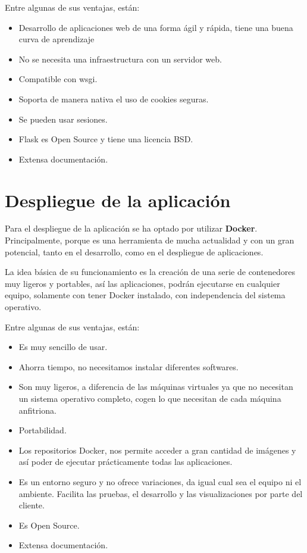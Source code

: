 Entre algunas de sus ventajas, están:
\begin{itemize}
\item Desarrollo de aplicaciones web de una forma ágil y rápida, tiene una buena curva de aprendizaje
\item No se necesita una infraestructura con un servidor web.
\item Compatible con wsgi.
\item Soporta de manera nativa el uso de cookies seguras.
\item Se pueden usar sesiones.
\item Flask es Open Source y tiene una licencia BSD.
\item Extensa documentación.
\end{itemize}

\section{Despliegue de la aplicación}

Para el despliegue de la aplicación se ha optado por utilizar \textbf{Docker}. Principalmente, porque es una herramienta de mucha actualidad y con un gran potencial, tanto en el desarrollo, como en el despliegue de aplicaciones.

La idea básica de su funcionamiento es la creación de una serie de contenedores muy ligeros y portables, así las aplicaciones, podrán ejecutarse en cualquier equipo, solamente con tener Docker instalado, con independencia del sistema operativo.

Entre algunas de sus ventajas, están:

\begin{itemize}
\item Es muy sencillo de usar.
\item Ahorra tiempo, no necesitamos instalar diferentes softwares.
\item Son muy ligeros, a diferencia de las máquinas virtuales ya que no necesitan un sistema operativo completo, cogen lo que necesitan de cada máquina anfitriona.
\item Portabilidad.
\item Los repositorios Docker, nos permite acceder a gran cantidad de imágenes y así poder de ejecutar prácticamente todas las aplicaciones.
\item Es un entorno seguro y no ofrece variaciones, da igual cual sea el equipo ni el ambiente. Facilita las pruebas, el desarrollo y las visualizaciones por parte del cliente.
\item Es Open Source.
\item Extensa documentación.
\end{itemize}
